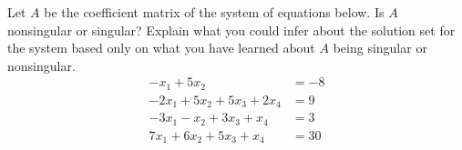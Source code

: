 Let $A$ be the coefficient matrix of the system of equations below.  Is $A$ nonsingular or singular?  Explain what you could infer about the solution set for the system based only on what you have learned about $A$ being singular or nonsingular. 
%
\begin{align*}
-x_1+5x_2&=-8\\
-2x_1+5x_2+5x_3+2x_4&=9\\
-3x_1-x_2+3x_3+x_4&=3\\
7x_1+6x_2+5x_3+x_4&=30
\end{align*}
%
